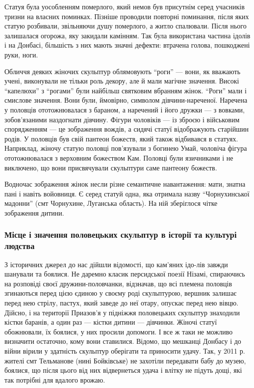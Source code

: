 
Статуя була уособленням померлого, який немов був присутнім серед учасників
тризни на власних поминках. Пізніше проводили повторні поминання, після яких
статую розбивали, звільняючи душу померлого, а житло спалювали. Після нього
залишалася огорожа, яку закидали камінням. Так була використана частина ідолів
і на Донбасі, більшість з них мають значні дефекти: втрачена голова, пошкоджені
руки, ноги.

Обличчя деяких жіночих скульптур облямовують \enquote{роги} — вони, як вважають учені,
виконували не тільки роль декору, але й мали магічне значення. Високі
\enquote{капелюхи} з \enquote{рогами} були найбільш святковим вбранням жінок. \enquote{Роги} мали і
смислове значення. Вони були, ймовірно, символом дівчини-нареченої. Наречена у
половців ототожнювалася з бараном, а наречений і його дружки — з вовками,
зобов'язаними наздогнати дівчину. Фігури чоловіків — із зброєю і військовим
спорядженням — це зображення вождів, а сидячі статуї відображують старійшин
родів. У половців був свій пантеон божеств, який також відбивався в статуях.
Наприклад, жіночу статую половці пов'язували з богинею Умай, чоловіча фігура
ототожнювалася з верховним божеством Кам. Половці були язичниками і не
виключено, що вони присвячували скульптури саме пантеону божеств.

Водночас зображення жінок несли різне семантичне навантаження: мати, знатна
пані і навіть войовниця. Є серед статуй одна, яка отримала назву \enquote{Чорнухинської
мадонни} (смт Чорнухине, Луганська область). На ній зберіглося чітке зображення
дитини.


\subsubsection{Місце і значення половецьких скульптур в історії та культурі людства}

З історичних джерел до нас дійшли відомості, що кам'яних ідо\hyp{}лів завжди шанували
та боялися. Не даремно класик персидської поезії Нізамі, спираючись на
розповіді своєї дружини-половчанки, відзначав, що всі племена половців
згинаються перед цією єдиною у своєму роді скульптурою, вершник залишає перед
нею стрілу, пастух, який заведе до неї отару, опускає перед нею вівцю. Дійсно,
і на території Приазов'я у підніжжя половецьких скульптур знаходили кістки
баранів, а один раз — кістки дитини — дівчинки. Жіночі статуї обожнювали, їх
боялися, у них просили допомоги. І все ж таки не можливо визначити остаточно,
кому вони ставилися. Відомо, що мешканці Донбасу і до війни вірили у здатність
скульптур оберігати та приносити удачу. Так, у 2011 р. жителі смт Тельманове
(нині Бойківське) не захотіли передавати бабу до музею, боялися, що після цього
від них відвернеться удача і влітку не підуть дощі, які так потрібні для
вдалого врожаю.

